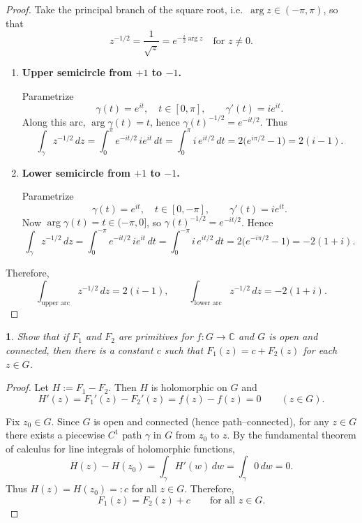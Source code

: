 \documentclass[12pt, a4paper]{report}
\theoremstyle{spaced}
\newtheorem{exercise}{}
\newcommand{\setexercise}[1]{\setcounter{exercise}{#1-1}}
\begin{document}
\begin{proof}
	Take the principal branch of the square root, i.e.\ \(\arg z\in(-\pi,\pi)\), so that
	\[
		z^{-1/2} = \frac{1}{\sqrt{z}} = e^{-\tfrac{i}{2}\arg z}
		\quad\text{for } z\neq 0.
	\]

	\begin{enumerate}\itemsep0pt
		\item[(a)] \textbf{Upper semicircle from \(+1\) to \(-1\).}

			Parametrize
			\[
				\gamma(t) = e^{it},\quad t\in[0,\pi], \qquad \gamma'(t) = i e^{it}.
			\]
			Along this arc, \(\arg \gamma(t)=t\), hence \(\gamma(t)^{-1/2} = e^{-it/2}\). Thus
			\[
				\int_\gamma z^{-1/2}\,dz
				= \int_0^\pi e^{-it/2} \, i e^{it}\,dt
				= \int_0^\pi i\,e^{it/2}\,dt
				= 2\bigl(e^{i\pi/2}-1\bigr)
				= 2(i-1).
			\]

		\item[(b)] \textbf{Lower semicircle from \(+1\) to \(-1\).}

			Parametrize
			\[
				\gamma(t) = e^{it},\quad t\in[0,-\pi], \qquad \gamma'(t) = i e^{it}.
			\]
			Now \(\arg \gamma(t)=t \in(-\pi,0]\), so \(\gamma(t)^{-1/2} = e^{-it/2}\). Hence
			\[
				\int_\gamma z^{-1/2}\,dz
				= \int_0^{-\pi} e^{-it/2}\, i e^{it}\,dt
				= \int_0^{-\pi} i\, e^{it/2}\,dt
				= 2\bigl(e^{-i\pi/2}-1\bigr)
				= -2(1+i).
			\]
	\end{enumerate}

	Therefore,
	\[
		\int_{\text{upper arc}} z^{-1/2}\,dz = 2(i-1),\qquad
		\int_{\text{lower arc}} z^{-1/2}\,dz = -2(1+i).
	\]
\end{proof}


\setexercise{21}
\begin{exercise}
	Show that if $F_1$ and $F_2$ are primitives for $f:G\to\mathbb{C}$ and $G$ is open and connected, then there is a constant $c$ such that $F_1(z)=c+F_2(z)$ for each $z\in G$.
\end{exercise}

\begin{proof}
	Let \(H := F_1 - F_2\). Then \(H\) is holomorphic on \(G\) and
	\[
		H'(z) = F_1'(z) - F_2'(z) = f(z) - f(z) = 0 \qquad (z \in G).
	\]

	Fix \(z_0 \in G\). Since \(G\) is open and connected (hence path–connected), for any
	\(z \in G\) there exists a piecewise \(C^1\) path \(\gamma\) in \(G\) from \(z_0\) to \(z\).
	By the fundamental theorem of calculus for line integrals of holomorphic functions,
	\[
		H(z) - H(z_0) = \int_\gamma H'(w)\,dw = \int_\gamma 0\,dw = 0.
	\]
	Thus \(H(z)=H(z_0)=:c\) for all \(z \in G\). Therefore,
	\[
		F_1(z) = F_2(z) + c \qquad \text{for all } z \in G.
	\]
\end{proof}
\end{document}
